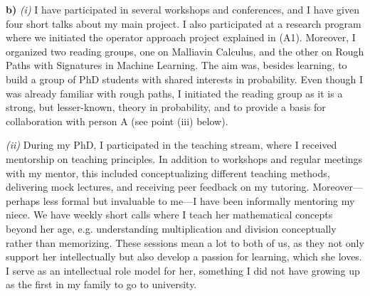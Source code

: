 \documentclass[./Research_statement.tex]{subfiles}
\begin{document}
\vspace{2pt}

\noindent \textbf{b)} \textit{(i)}
I have participated in several workshops and conferences, and I have given four short talks about my main project. I also participated at a research program where we initiated the operator approach project explained in (A1). Moreover, I organized two reading groups, one on Malliavin Calculus, and the other on Rough Paths with Signatures in Machine Learning. The aim was, besides learning, to build a group of PhD students with shared interests in probability. Even though I was already familiar with rough paths, I initiated the reading group as it is a strong, but lesser-known, theory in probability, and to provide a basis for collaboration with person A (see point (iii) below).


\vspace{2pt}

\noindent \textit{(ii)}  During my PhD, I participated in the teaching stream, where I received mentorship on teaching principles. In addition to workshops and regular meetings with my mentor, this included conceptualizing different teaching methods, delivering mock lectures, and receiving peer feedback on my tutoring. Moreover---perhaps less formal but invaluable to me---I have been informally mentoring my niece. We have weekly short calls where I teach her mathematical concepts beyond her age, e.g. understanding multiplication and division conceptually rather than memorizing. These sessions mean a lot to both of us, as they not only support her intellectually but also develop a passion for learning, which she loves. I serve as an intellectual role model for her, something I did not have growing up as the first in my family to go to university.


\vspace{2pt}
\end{document}
